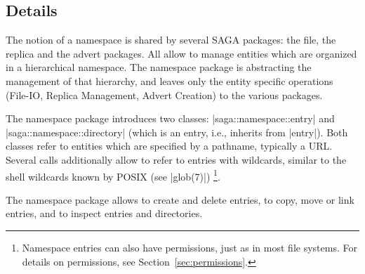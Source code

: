  \subsection{Details}

  The notion of a namespace is shared by several SAGA packages: the
  file, the replica and the advert packages. All allow to manage
  entities which are organized in a hierarchical namespace.  The
  namespace package is abstracting the management of that hierarchy,
  and leaves only the entity specific operations (File-IO, Replica
  Management, Advert Creation) to the various packages.

  
  The namespace package introduces two classes:
  |saga::namespace::entry| and |saga::namespace::directory| (which is
  an entry, i.e., inherits from |entry|).  Both classes refer to
  entities which are specified by a pathname, typically a URL.
  Several calls additionally allow to refer to entries with wildcards,
  similar to the shell wildcards known by POSIX (see |glob(7)|)
  \footnote{Namespace entries can also have permissions, just as
  in most file systems.  For details on permissions, see
  Section~\ref{sec:permissions}.}.

  The namespace package allows to create and delete entries, to copy,
  move or link entries, and to inspect entries and directories.


